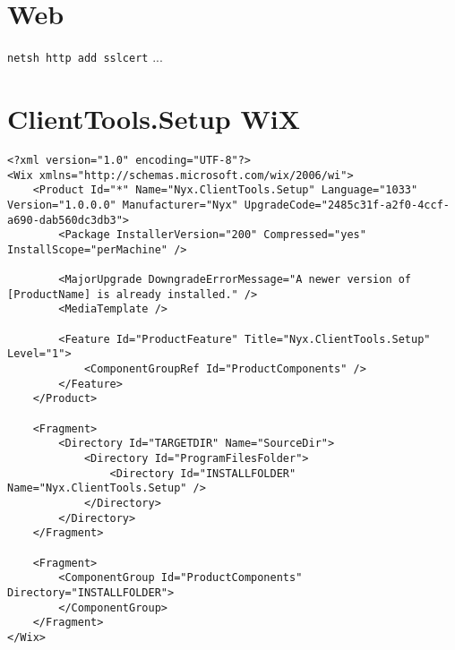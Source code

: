 \section{Web}
\label{ch:deployweb}
\texttt{netsh http add sslcert}
...

\section{ClientTools.Setup WiX}
\label{ch:wix}
\begin{lstlisting}[style=XML]
<?xml version="1.0" encoding="UTF-8"?>
<Wix xmlns="http://schemas.microsoft.com/wix/2006/wi">
	<Product Id="*" Name="Nyx.ClientTools.Setup" Language="1033" Version="1.0.0.0" Manufacturer="Nyx" UpgradeCode="2485c31f-a2f0-4ccf-a690-dab560dc3db3">
		<Package InstallerVersion="200" Compressed="yes" InstallScope="perMachine" />

		<MajorUpgrade DowngradeErrorMessage="A newer version of [ProductName] is already installed." />
		<MediaTemplate />

		<Feature Id="ProductFeature" Title="Nyx.ClientTools.Setup" Level="1">
			<ComponentGroupRef Id="ProductComponents" />
		</Feature>
	</Product>

	<Fragment>
		<Directory Id="TARGETDIR" Name="SourceDir">
			<Directory Id="ProgramFilesFolder">
				<Directory Id="INSTALLFOLDER" Name="Nyx.ClientTools.Setup" />
			</Directory>
		</Directory>
	</Fragment>

	<Fragment>
		<ComponentGroup Id="ProductComponents" Directory="INSTALLFOLDER">
		</ComponentGroup>
	</Fragment>
</Wix>
\end{lstlisting}